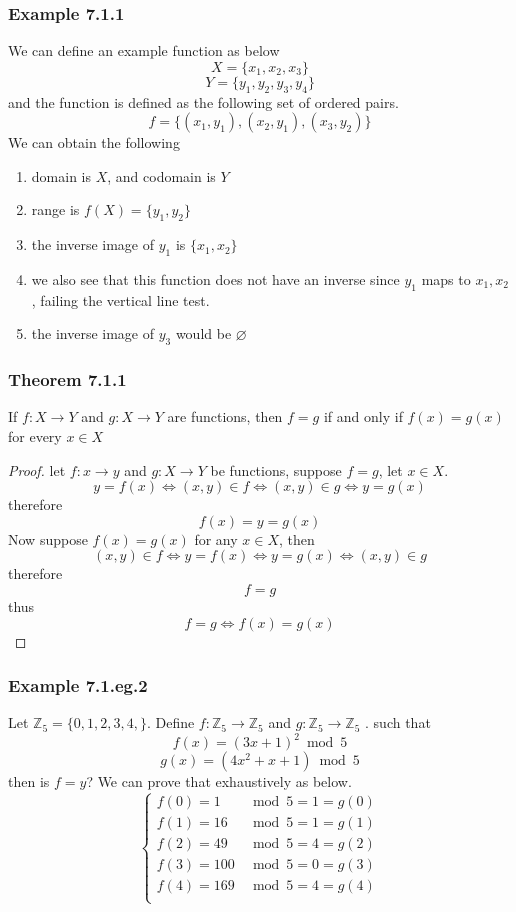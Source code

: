 \documentclass[12pt]{book}
\newcommand{\Z}{\mathbb{Z}}
\begin{document}
\subsubsection{Example 7.1.1}
We can define an example function as below
\[
X = \{ x_1,x_2,x_3\}
\]
\[
Y = \{ y_1, y_2, y_3,y_4\}
\]
and the function is defined as the following set of ordered pairs. 
\[
f = \{ (x_1,y_1), (x_2,y_1), (x_3,y_2)\}
\]
We can obtain the following
\begin{enumerate}
    \item domain is $X$, and codomain is $Y$
    \item range is $f(X) = \{ y_1, y_2\}$
    \item the inverse image of $y_1$ is $\{x_1,x_2\}$
    \item we also see that this function does not have an inverse since $y_1$ maps to $x_1,x_2$, failing the vertical line test. 
    \item the inverse image of $y_3$ would be $\varnothing$
\end{enumerate}

\subsubsection{Theorem 7.1.1}
If $f \colon X \to Y$ and $g \colon X \to Y$ are functions, then $f=g$ if and only if $f(x) = g(x)$ for every $x \in X$
\begin{proof}
    let $f \colon x \to y$ and $g \colon X \to Y$ be functions, suppose $f=g$, let $x \in X$.
    \[
    y = f(x) \iff (x,y)\in f \iff (x,y) \in g \iff y = g(x)
    \]
    therefore
    \[
    f(x) = y = g(x)
    \]
    Now suppose $f(x) = g(x)$ for any $x \in X$, then
    \[
    (x,y) \in f \iff y = f(x) \iff y = g(x) \iff (x,y) \in g
    \]
    therefore
    \[
    f = g
    \]
    thus
    \[
    f = g \iff f(x) = g(x)
    \]
\end{proof}



\subsubsection{Example 7.1.eg.2}
Let $\Z_5 = \{0,1,2,3,4,\}$. Define $f\colon \Z_5 \to \Z_5$ and $g\colon \Z_5 \to \Z_5$ . such that
\[
f(x) = (3x+1)^2 \bmod 5
\]
\[
g(x) = (4x^2+x+1) \bmod 5
\]
then is $f=y$? We can prove that exhaustively as below.
\[
\begin{cases}
    f(0) = 1  &\bmod 5 = 1 = g(0)\\
    f(1) = 16 &\bmod 5 = 1 = g(1)\\
    f(2) = 49 &\bmod 5 = 4 = g(2)\\
    f(3) =100 &\bmod 5 = 0 = g(3)\\
    f(4) =169 &\bmod 5 = 4 = g(4)\\
\end{cases}
\]
\end{document}
